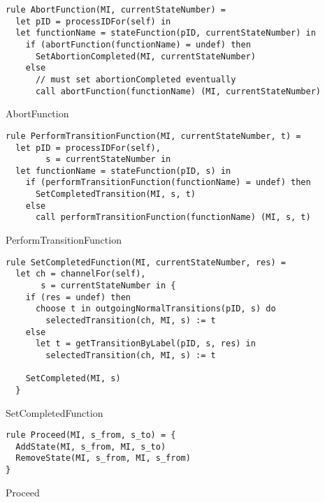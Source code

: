\begin{listing}[H]
\begin{verbatim}
rule AbortFunction(MI, currentStateNumber) =
  let pID = processIDFor(self) in
  let functionName = stateFunction(pID, currentStateNumber) in
    if (abortFunction(functionName) = undef) then
      SetAbortionCompleted(MI, currentStateNumber)
    else
      // must set abortionCompleted eventually
      call abortFunction(functionName) (MI, currentStateNumber)
\end{verbatim}
\caption{AbortFunction}
\label{lst:asm:AbortFunction}
\end{listing}




\begin{listing}[H]
\begin{verbatim}
rule PerformTransitionFunction(MI, currentStateNumber, t) =
  let pID = processIDFor(self),
        s = currentStateNumber in
  let functionName = stateFunction(pID, s) in
    if (performTransitionFunction(functionName) = undef) then
      SetCompletedTransition(MI, s, t)
    else
      call performTransitionFunction(functionName) (MI, s, t)
\end{verbatim}
\caption{PerformTransitionFunction}
\label{lst:asm:PerformTransitionFunction}
\end{listing}




\begin{listing}[H]
\begin{verbatim}
rule SetCompletedFunction(MI, currentStateNumber, res) =
  let ch = channelFor(self),
       s = currentStateNumber in {
    if (res = undef) then
      choose t in outgoingNormalTransitions(pID, s) do
        selectedTransition(ch, MI, s) := t
    else
      let t = getTransitionByLabel(pID, s, res) in
        selectedTransition(ch, MI, s) := t

    SetCompleted(MI, s)
  }
\end{verbatim}
\caption{SetCompletedFunction}
\label{lst:asm:SetCompletedFunction}
\end{listing}



\begin{listing}[H]
\begin{verbatim}
rule Proceed(MI, s_from, s_to) = {
  AddState(MI, s_from, MI, s_to)
  RemoveState(MI, s_from, MI, s_from)
}
\end{verbatim}
\caption{Proceed}
\label{lst:asm:Proceed}
\end{listing}




